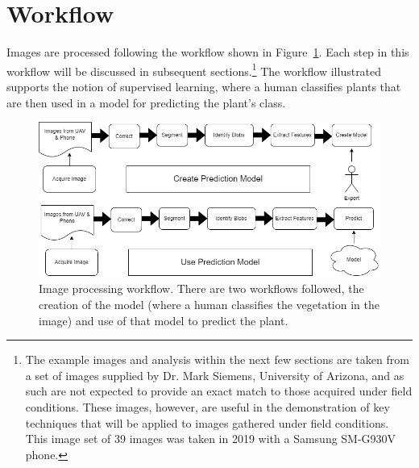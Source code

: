 \documentclass[letterpaper]{article}
\begin{document}
\section{Workflow}
Images are processed following the workflow shown in Figure~\ref{fig:workflow}. Each step in this workflow will be discussed in subsequent sections.\footnote{The example images and analysis within the next few sections are taken from a set of images supplied by Dr. Mark Siemens, University of Arizona, and as such are not expected to provide an exact match to those acquired under field conditions. These images, however, are useful in the demonstration of key techniques that will be applied to images gathered under field conditions. This image set of 39 images was taken in 2019 with a Samsung SM-G930V phone.} The workflow illustrated supports the notion of supervised learning, where a human classifies plants that are then used in a model for predicting the plant's class.
\begin{figure}[H]
	\centering
	\includegraphics[width=0.85\linewidth]{./figures/workflow.png}
	\caption{Image processing workflow. There are two workflows followed, the creation of the model (where a human classifies the vegetation in the image) and use of that model to predict the plant.}
	\label{fig:workflow}	
\end{figure}
\end{document}
